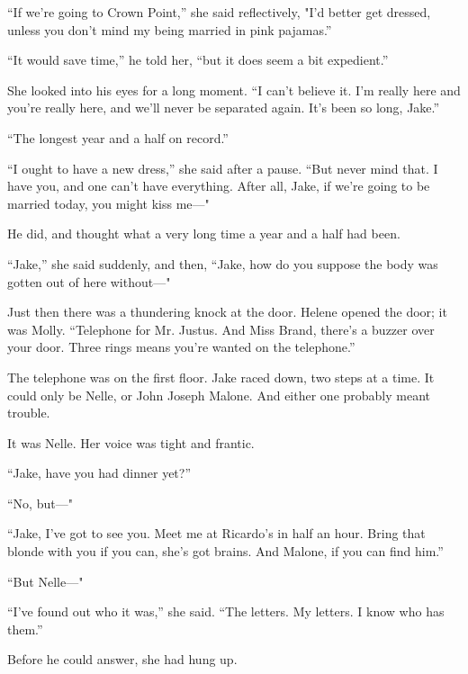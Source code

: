 \documentclass{novel}
\begin{document}
“If we’re going to Crown Point,” she said reflectively, "I'd better get dressed, unless you don’t mind my being married in pink pajamas.”

“It would save time,” he told her, “but it does seem a bit expedient.”

She looked into his eyes for a long moment. “I can’t believe it. I'm really here and you’re really here, and we’ll never be separated again. It’s been so long, Jake.”

“The longest year and a half on record.”

“I ought to have a new dress,” she said after a pause. “But never mind that. I have you, and one can’t have everything. After all, Jake, if we’re going to be married today, you might kiss me—"

He did, and thought what a very long time a year and a half had been.

“Jake,” she said suddenly, and then, “Jake, how do you suppose the body was gotten out of here without—"

Just then there was a thundering knock at the door. Helene opened the door; it was Molly. “Telephone for Mr. Justus. And Miss Brand, there’s a buzzer over your door. Three rings means you’re wanted on the telephone.”

The telephone was on the first floor. Jake raced down, two steps at a time. It could only be Nelle, or John Joseph Malone. And either one probably meant trouble.

It was Nelle. Her voice was tight and frantic.

“Jake, have you had dinner yet?”

“No, but—"

“Jake, I've got to see you. Meet me at Ricardo’s in half an hour. Bring that blonde with you if you can, she’s got brains. And Malone, if you can find him.”

“But Nelle—"

“I've found out who it was,” she said. “The letters. My letters. I know who has them.”

Before he could answer, she had hung up.

\begin{ChapterStart}
\vspace{3\nbs}
\end{ChapterStart}
\end{document}
